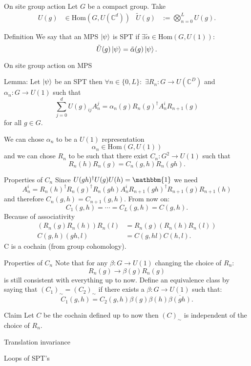 \documentclass{beamer}
\newcommand{\id}{\mathbbm{1}}
\newcommand{\CC}{\mathbb{C}}
\begin{document}
\begin{frame}{On site group action}
Let $G$ be a compact group. Take
\begin{align}
U(g)&\in\textrm{Hom}(G,U(\CC^d))&\tilde U(g)&:= \bigotimes_{n=0}^L U(g).
\end{align}
\pause
\begin{block}{Definition}
We say that an MPS $\ket{\psi}$ is SPT if $\exists \tilde{\alpha}\in\textrm{Hom}(G,U(1)):$
\[\tilde{U}(g)\ket{\psi}=\tilde{\alpha}(g)\ket{\psi}.\]
\end{block}
\end{frame}

\begin{frame}{On site group action on MPS}
\begin{block}{Lemma:}
Let $\ket{\psi}$ be an SPT then $\forall n\in\{0,L\}:$ $\exists R_n:G\rightarrow U(\CC^D)$ and $\alpha_n:G\rightarrow U(1)$ such that
\begin{equation}
\sum_{j=0}^{d}U(g)_{ij}A^j_n=\alpha_n(g) R_n(g)^\dagger A^i_n R_{n+1}(g)
\end{equation}
for all $g\in G.$
\end{block}
\pause
We can chose $\alpha_n$ to be a $U(1)$ representation
\[\alpha_n\in\textrm{Hom}(G,U(1))\]
\pause
and we can chose $R_n$ to be such that there exist $C_n:G^2\rightarrow U(1)$ such that
\[R_n(h)R_n(g)=C_n(g,h) R_n(gh).\]
\end{frame}

\begin{frame}{Properties of $C_n$}
Since $U(gh)^\dagger U(g)U(h)=\id$ we need
\begin{equation}
A_n^i=R_n(h)^\dagger R_n(g)^\dagger R_{n}(gh) A^i_n R_{n+1}(gh)^\dagger R_{n+1}(g) R_{n+1}(h)
\end{equation}
and therefore $C_n(g,h)=C_{n+1}(g,h)$. From now on:
\[C_1(g,h)=\cdots=C_L(g,h)=C(g,h).\]
\pause
Because of associativity
\begin{align*}
(R_n(g)R_n(h))R_n(l)&=R_n(g)(R_n(h)R_n(l))\\
C(g,h)(gh,l)&=C(g,hl)C(h,l).
\end{align*}
C is a cochain (from group cohomology).
\end{frame}

\begin{frame}{Properties of $C_n$}
Note that for any $\beta:G\rightarrow U(1)$ changing the choice of $R_n:$
\[R_n(g)\rightarrow \beta(g)R_n(g)\]
is still consistent with everything up to now.
\pause
Define an equivalence class by saying that $(C_1)_{\sim}=(C_2)_{\sim}$ if there exists a $\beta:G\rightarrow U(1)$ such that:
\[C_1(g,h)=C_2(g,h)\beta(g)\beta(h)\overline{\beta(gh)}.\]
\pause
\begin{block}{Claim}
Let $C$ be the cochain defined up to now then $(C)_\sim$ is independent of the choice of $R_n$.
\end{block}
\end{frame}

\begin{frame}{Translation invariance}
\end{frame}

\begin{frame}{Loops of SPT's}
\end{frame}
\end{document}
